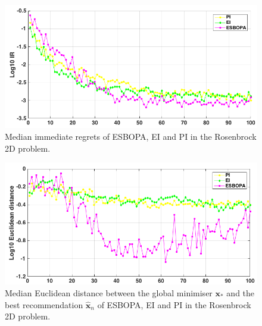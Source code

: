 \documentclass[a4paper,11pt]{report}
\begin{document}
\begin{figure} [H] \label{Rosenbrock_ESBOPAV4_IR}
	\centering
	 \includegraphics[width=0.8\linewidth]{Rosenbrock_ESBOPAV4_IR.png}
\caption{ Median immediate regrets of ESBOPA, EI and PI in the Rosenbrock 2D problem.}
\end{figure}

\begin{figure} [H]
\label{Rosenbrock_ESBOPAV4_Xnorm}
	\centering
	 \includegraphics[width=0.8\linewidth]{Rosenbrock_ESBOPAV4_Xnorm.png}
\caption{ Median Euclidean distance between the global minimiser $\mathbf{x}_{*}$ and the best recommendation $ \hat{\mathbf{x}}_{n}$ of ESBOPA, EI and PI in the Rosenbrock 2D problem.}
\end{figure}
\end{document}
